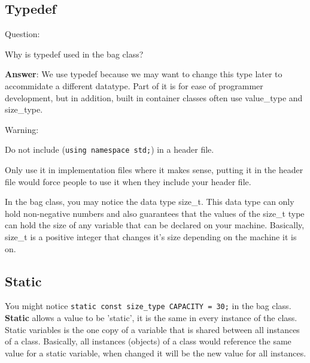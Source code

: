 \documentclass[11pt,a4paper,english]{paper}
\begin{document}
\subsection{Typedef}

\begin{gbox}{Question:} {

Why is typedef used in the bag class?

\bigskip

\textbf{Answer}: We use typedef because we may want to change this type later to accommidate a different datatype. Part of it is for ease of programmer development, but in addition, built in container classes often use value\_type and size\_type.


  }
\end{gbox}

\bigskip

\begin{mybox}{Warning:} {

    Do not include (\texttt{using namespace std;}) in a header file.

  \bigskip

  Only use it in implementation files where it makes sense, putting it in the header file would force people to use it when they include your header file.
  }

\end{mybox}

\bigskip

In the bag class, you may notice the data type size\_t. This data type can only hold non-negative numbers and also guarantees that the values of the size\_t type can hold the size of any variable that can be declared on your machine. Basically, size\_t is a positive integer that changes it's size depending on the machine it is on.

\subsection{Static}

You might notice \texttt{static const size_type CAPACITY = 30;} in the bag class. \textbf{Static} allows a value to be 'static', it is the same in every instance of the class. Static variables is the one copy of a variable that is shared between all instances of a class. Basically, all instances (objects) of a class would reference the same value for a static variable, when changed it will be the new value for all instances. 

\bigskip
\end{document}
